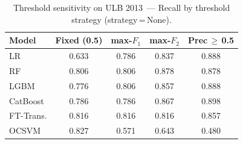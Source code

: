 \begin{table}[ht!]
\centering
\caption{Threshold sensitivity on ULB 2013~--- Recall by threshold strategy (strategy\,=\,None).}
\label{tab:threshold_ulb_recall}
\begin{tabular}{l c c c c}
\toprule
Model & Fixed (0.5) & max-$F_1$ & max-$F_2$ & Prec\,$\geq$\,0.5 \\
\midrule
LR         & 0.633 & 0.786 & 0.837 & 0.888 \\
RF         & 0.806 & 0.806 & 0.878 & 0.878 \\
LGBM       & 0.776 & 0.806 & 0.857 & 0.888 \\
CatBoost   & 0.786 & 0.786 & 0.867 & 0.898 \\
FT-Trans.  & 0.816 & 0.816 & 0.816 & 0.857 \\
OCSVM      & 0.827 & 0.571 & 0.643 & 0.480 \\
\bottomrule
\end{tabular}
\end{table}